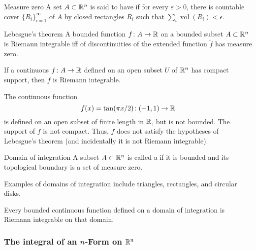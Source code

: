 \begin{definition}{Measure zero}
    A set \(A \subset \mathbb{R}^n\) is said to have  if for every \(\varepsilon > 0\), there is countable cover \(\{ R_i \}_{i=1}^\infty\) of \(A\) by closed rectangles \(R_i\) such that \(\sum_i \operatorname{vol}(R_i) <\epsilon\).
\end{definition}
\begin{theorem}{Lebesgue's theorem}{}
    A bounded function \(f \colon A \rightarrow \mathbb{R}\) on a bounded subset \(A \subset \mathbb{R}^n\) is Riemann integrable iff of discontinuities of the extended function \(\tilde{f}\) has measure zero.
\end{theorem}
\begin{proposition}{}{}
    If a continuous \(f \colon A \rightarrow \mathbb{R}\) defined on an open subset \(U\) of \(\mathbb{R}^n\) has compact support, then \(f\) is Riemann integrable.
\end{proposition}
\begin{example}{}{}
    The continuous function 
    \[f(x) = \tan(\pi x/2) \colon (-1,1) \rightarrow \mathbb{R}\]
    is defined on an open subset of finite length in \(\mathbb{R}\), but is not bounded.
    The support of \(f\) is not compact. 
    Thus, \(f\) does not satisfy the hypotheses of Lebesgue's theorem (and incidentally it is not Riemann integrable).
\end{example}
\begin{definition}{Domain of integration}{}
    A subset \(A \subset \mathbb{R}^n\)  is called a  if it is bounded and its topological boundary is a set of measure zero.
\end{definition}
Examples of domains of integration include triangles, rectangles, and circular disks.
\begin{proposition}{}{}
    Every bounded continuous function defined on a domain of integration is Riemann integrable on that domain. 
\end{proposition}

\subsubsection{The integral of an \(n\)-Form on \(\mathbb{R}^n\)}

